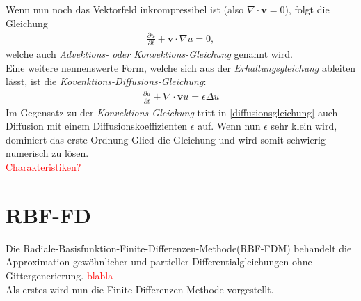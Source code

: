 \documentclass[a4paper,11pt]{article}
\newcommand{\col}[2][red]{\textcolor{#1}{#2}}
\begin{document}
Wenn nun noch das Vektorfeld inkrompressibel ist (also $\nabla \cdot \textbf{v}=0$), folgt die Gleichung
\begin{align}
 \frac{\partial u}{\partial t}+\textbf{v}\cdot\nabla u=0,
\end{align}
welche auch \textit{Advektions- oder Konvektions-Gleichung} genannt wird.\\
Eine weitere nennenswerte Form, welche sich aus der \textit{Erhaltungsgleichung} ableiten lässt, ist die \textit{Kovenktions-Diffusions-Gleichung}:
\begin{align}
 \frac{\partial u}{\partial t}+\nabla \cdot \textbf{v}u = \epsilon\Delta u\label{diffusionsgleichung}
\end{align}
Im Gegensatz zu der \textit{Konvektions-Gleichung} tritt in \eqref{diffusionsgleichung} auch Diffusion mit einem Diffusionskoeffizienten $\epsilon$ auf. Wenn nun $\epsilon$ sehr klein wird, dominiert das erste-Ordnung Glied die Gleichung und wird somit schwierig numerisch zu lösen.\\
\col{Charakteristiken?}
~\cite{segal2013numerik}
\pagebreak
\section{RBF-FD}\label{sec:RBF-FD}
Die Radiale-Basisfunktion-Finite-Differenzen-Methode(RBF-FDM) behandelt die Approximation gewöhnlicher und partieller Differentialgleichungen ohne Gittergenerierung. \col{blabla}\\
Als erstes wird nun die Finite-Differenzen-Methode vorgestellt.
\end{document}
